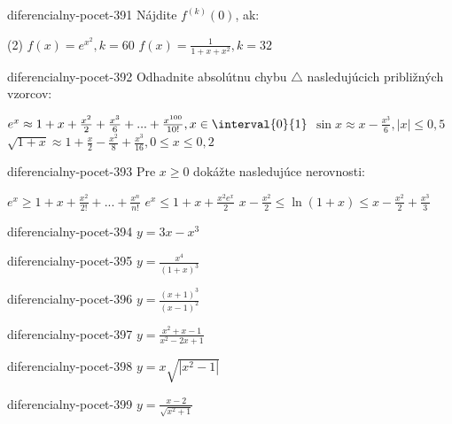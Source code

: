 \begin{defproblem}{diferencialny-pocet-391}
Nájdite $f^{(k)}(0)$, ak:
\begin{tasks}(2)
  \task $f(x)=e^{x^2},k=60$
  \task $f(x)=\frac{1}{1+x+x^2},k=32$
\end{tasks}
\end{defproblem}

\begin{defproblem}{diferencialny-pocet-392}
Odhadnite absolútnu chybu $\bigtriangleup$ nasledujúcich približných vzorcov:
\begin{tasks}
\task
  $e^x\approx 1+x+\frac{x^2}{2}+\frac{x^3}{6} + ...
    + \frac{x^{100}}{10!},x \in \interval{0}{1}$
\task
  $\sin x\approx x-\frac{x^3}{6},|x|\leq 0,5$
\task
  $\sqrt{1+x}\approx 1+\frac{x}{2}-\frac{x^2}{8}+\frac{x^3}{16},0\leq x\leq 0,2$
\end{tasks}
\end{defproblem}

\begin{defproblem}{diferencialny-pocet-393}
Pre $x \geq 0$ dokážte nasledujúce nerovnosti:
\begin{tasks}
\task $e^x\geq 1+x+\frac{x^2}{2!}+...+\frac{x^n}{n!}$
\task $e^x\leq 1+x+\frac{x^2e^x}{2}$
\task $x-\frac{x^2}{2}\leq \ln (1+x)\leq x-\frac{x^2}{2}+\frac{x^3}{3}$
\end{tasks}
\end{defproblem}

\begin{defproblem}{diferencialny-pocet-394}
$y=3x-x^3$
\end{defproblem}

\begin{defproblem}{diferencialny-pocet-395}
$y=\frac{x^4}{(1+x)^3}$
\end{defproblem}

\begin{defproblem}{diferencialny-pocet-396}
$y=\frac{(x+1)^3}{(x-1)^2}$
\end{defproblem}

\begin{defproblem}{diferencialny-pocet-397}
$y=\frac{x^2+x-1}{x^2-2x+1}$
\end{defproblem}

\begin{defproblem}{diferencialny-pocet-398}
$y=x\sqrt{|x^2-1|}$
\end{defproblem}

\begin{defproblem}{diferencialny-pocet-399}
$y=\frac{x-2}{\sqrt{x^2+1}}$
\end{defproblem}

